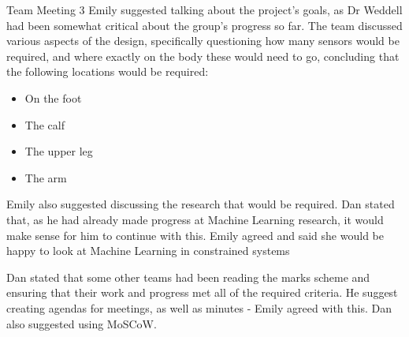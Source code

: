 \documentclass{article}
\begin{document}
\begin{Minutes}{Team Meeting 3}
Emily suggested talking about the project's goals, as Dr Weddell had been somewhat critical about the group's
progress so far. The team discussed various aspects of the design, specifically questioning how many sensors
would be required, and where exactly on the body these would need to go, concluding that the following
locations would be required:
\begin{itemize}
	\item On the foot
	\item The calf
	\item The upper leg
	\item The arm
\end{itemize}

Emily also suggested discussing the research that would be required. Dan stated that, as he had already made
progress at Machine Learning research, it would make sense for him to continue with this. Emily agreed and
said she would be happy to look at Machine Learning in constrained systems

Dan stated that some other teams had been reading the marks scheme and ensuring that their work and progress
met all of the required criteria. He suggest creating agendas for meetings, as well as minutes - Emily agreed
with this. Dan also suggested using MoSCoW.


\end{Minutes}
\end{document}
